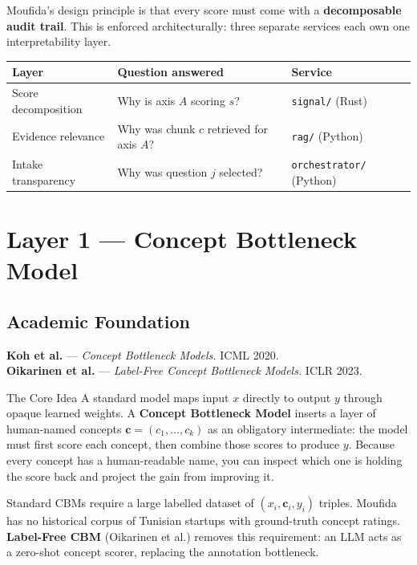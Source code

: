 \documentclass[11pt,a4paper]{article}
\begin{document}
Moufida's design principle is that every score must come with a \textbf{decomposable
audit trail}. This is enforced architecturally: three separate services each own one
interpretability layer.

\begin{center}\small
\begin{tabular}{@{}lll@{}}
\toprule
\textbf{Layer} & \textbf{Question answered} & \textbf{Service} \\
\midrule
Score decomposition & Why is axis $A$ scoring $s$? & \texttt{signal/} (Rust) \\
Evidence relevance  & Why was chunk $c$ retrieved for axis $A$? & \texttt{rag/} (Python) \\
Intake transparency & Why was question $j$ selected? & \texttt{orchestrator/} (Python) \\
\bottomrule
\end{tabular}
\end{center}

\section{Layer 1 — Concept Bottleneck Model}

\subsection{Academic Foundation}

\textbf{Koh et al.} — \textit{Concept Bottleneck Models.} ICML 2020.\\
\textbf{Oikarinen et al.} — \textit{Label-Free Concept Bottleneck Models.} ICLR 2023.

\begin{conceptbox}{The Core Idea}
A standard model maps input $x$ directly to output $y$ through opaque learned weights.
A \textbf{Concept Bottleneck Model} inserts a layer of human-named concepts
$\mathbf{c} = (c_1, \dots, c_k)$ as an obligatory intermediate: the model must first
score each concept, then combine those scores to produce $y$.
Because every concept has a human-readable name, you can inspect which one is holding
the score back and project the gain from improving it.
\end{conceptbox}

\begin{notebox}
Standard CBMs require a large labelled dataset of $(x_i, \mathbf{c}_i, y_i)$ triples.
Moufida has no historical corpus of Tunisian startups with ground-truth concept ratings.
\textbf{Label-Free CBM} (Oikarinen et al.) removes this requirement: an LLM acts as a
zero-shot concept scorer, replacing the annotation bottleneck.
\end{notebox}
\end{document}
